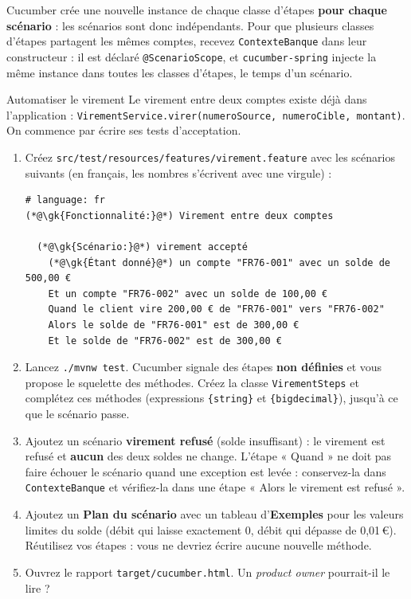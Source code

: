 \documentclass[11pt]{article}
\newcommand{\gk}[1]{\textcolor{qacodekwl}{\textbf{#1}}}
\begin{document}
\begin{infobox}
Cucumber crée une nouvelle instance de chaque classe d'étapes \textbf{pour chaque scénario} : les scénarios sont donc indépendants. Pour que plusieurs classes d'étapes partagent les mêmes comptes, recevez \texttt{ContexteBanque} dans leur constructeur : il est déclaré \texttt{@ScenarioScope}, et \texttt{cucumber-spring} injecte la même instance dans toutes les classes d'étapes, le temps d'un scénario.
\end{infobox}

\begin{exobox}{Automatiser le virement}
Le virement entre deux comptes existe déjà dans l'application : \texttt{VirementService.virer(numeroSource, numeroCible, montant)}. On commence par écrire ses tests d'acceptation.
\begin{enumerate}[leftmargin=1.4em]
  \item Créez \texttt{src/test/resources/features/virement.feature} avec les scénarios suivants (en français, les nombres s'écrivent avec une virgule) :
\begin{lstlisting}[language=Gherkin]
# language: fr
(*@\gk{Fonctionnalité:}@*) Virement entre deux comptes

  (*@\gk{Scénario:}@*) virement accepté
    (*@\gk{Étant donné}@*) un compte "FR76-001" avec un solde de 500,00 €
    Et un compte "FR76-002" avec un solde de 100,00 €
    Quand le client vire 200,00 € de "FR76-001" vers "FR76-002"
    Alors le solde de "FR76-001" est de 300,00 €
    Et le solde de "FR76-002" est de 300,00 €
\end{lstlisting}
  \item Lancez \texttt{./mvnw test}. Cucumber signale des étapes \textbf{non définies} et vous propose le squelette des méthodes. Créez la classe \texttt{VirementSteps} et complétez ces méthodes (expressions \texttt{\{string\}} et \texttt{\{bigdecimal\}}), jusqu'à ce que le scénario passe.
  \item Ajoutez un scénario \textbf{virement refusé} (solde insuffisant) : le virement est refusé et \textbf{aucun} des deux soldes ne change. L'étape « Quand » ne doit pas faire échouer le scénario quand une exception est levée : conservez-la dans \texttt{ContexteBanque} et vérifiez-la dans une étape « Alors le virement est refusé ».
  \item Ajoutez un \textbf{Plan du scénario} avec un tableau d'\textbf{Exemples} pour les valeurs limites du solde (débit qui laisse exactement 0, débit qui dépasse de 0,01\,\euro{}). Réutilisez vos étapes : vous ne devriez écrire aucune nouvelle méthode.
  \item Ouvrez le rapport \texttt{target/cucumber.html}. Un \textit{product owner} pourrait-il le lire ?
\end{enumerate}
\end{exobox}
\end{document}
